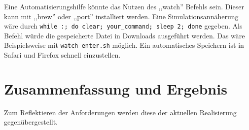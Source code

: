 \documentclass[oneside, ngerman, toc=bibliography,bibliography=totoc,listof=entryprefix, open=right,numbers=noenddot,fontsize=12pt]{scrbook}
\begin{document}
Eine Automatisierungshilfe könnte das Nutzen des ,,watch'' Befehls sein. Dieser kann mit ,,brew'' oder ,,port'' installiert werden. 
Eine Simulationsannäherung wäre durch \verb|while :; do clear; your_command; sleep 2; done| gegeben.
Als Befehl würde die gespeicherte Datei in Downloads ausgeführt werden. Das wäre Beispielsweise mit \verb|watch enter.sh| möglich.
Ein automatisches Speichern ist in Safari und Firefox schnell einzustellen.


 
 

\section{Zusammenfassung und Ergebnis}
Zum Reflektieren der Anforderungen werden diese der aktuellen Realisierung gegenübergestellt.
\end{document}
